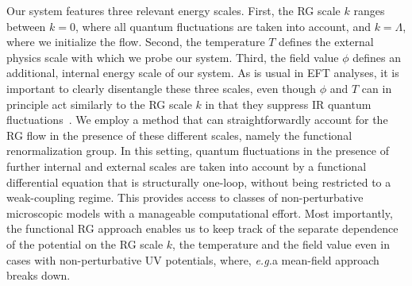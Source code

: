 \documentclass[aps,prd,11pt,tightenlines,superscriptaddress,nofootinbib,preprintnumbers,notitlepage]{revtex4-1}
\newcommand{\eg}{\textsl{e.g.}\;}
\begin{document}
Our system features three relevant energy scales. First, the RG scale
$k$ ranges between $k=0$, where all quantum fluctuations are taken
into account, and $k=\Lambda$, where we initialize the flow. Second,
the temperature $T$ defines the external physics scale with which we
probe our system. Third, the field value $\phi$ defines an additional,
internal energy scale of our system. As is usual in EFT analyses, it is
important to clearly disentangle these three scales, even though $\phi$
and $T$ can in principle act similarly to the RG scale $k$ in that
they suppress IR quantum fluctuations~\cite{our_paper}. We employ a method
that can straightforwardly account for the RG flow in the presence of
these different scales, namely the functional renormalization group.
In this setting, quantum fluctuations in the presence of further
internal and external scales are taken into account by a functional
differential equation that is structurally one-loop, without being
restricted to a weak-coupling regime. This provides access to classes
of non-perturbative microscopic models with a manageable computational
effort. Most importantly, the functional RG approach enables us to
keep track of the separate dependence of the potential on the RG scale
$k$, the temperature and the field value even in cases with
non-perturbative UV potentials, where, \eg a mean-field approach
breaks down.\medskip
\end{document}

